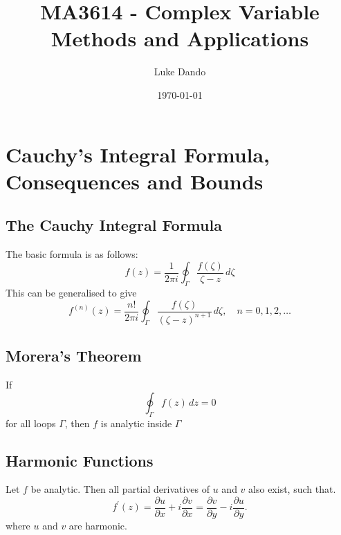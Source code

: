 \documentclass{article}
\title{MA3614 - Complex Variable Methods and Applications}
\author{Luke Dando}
\date{\today}
\begin{document}
\maketitle

\tableofcontents

\section{Cauchy's Integral Formula, Consequences and Bounds}
\subsection{The Cauchy Integral Formula}
The basic formula is as follows:
\begin{equation}
    f(z)=\frac{1}{2\pi i}\oint_\Gamma \frac{f(\zeta)}{\zeta-z}\,d\zeta
\end{equation}
This can be generalised to give
\begin{equation}
    f^{(n)}(z)=\frac{n!}{2\pi i}\oint_\Gamma \frac{f(\zeta)}{(\zeta-z)^{n+1}}\,d\zeta
,\quad n=0,1,2,\ldots \end{equation}
\subsection{Morera's Theorem}
If
\begin{equation}
    \oint_\Gamma f(z)\,dz=0
\end{equation}
for all loops $\Gamma$, then $f$ is analytic inside $\Gamma$

\subsection{Harmonic Functions}
Let $f$ be analytic. Then all partial derivatives of $u$ and $v$ also exist, such that. 
\begin{equation}
    f^\prime(z)=\frac{\partial u}{\partial x} + i \frac{\partial v}{\partial x} = \frac{\partial v}{\partial y} -i\frac{\partial u}{\partial y}.
\end{equation}
where $u$ and $v$ are harmonic.
\end{document}
